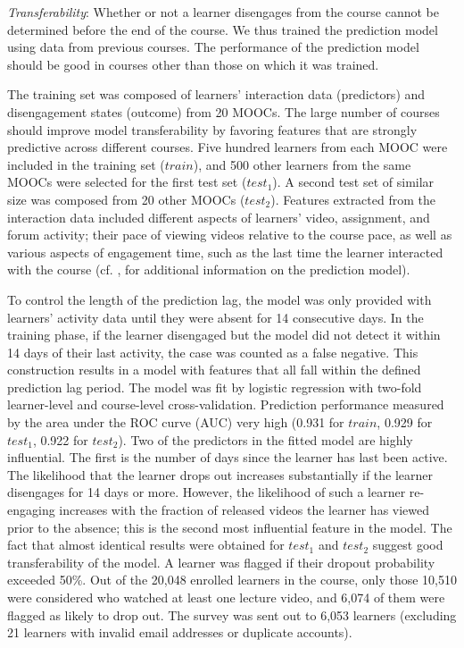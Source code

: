 \documentclass{sigchi}\usepackage[]{graphicx}\usepackage[]{color}
\begin{document}
\textit{Transferability}: Whether or not a learner disengages from the course cannot be determined before the end of the course. We thus trained the prediction model using data from previous courses. The performance of the prediction model should be good in courses other than those on which it was trained.

The training set was composed of learners' interaction data (predictors) and disengagement states (outcome) from 20 MOOCs. The large number of courses should improve model transferability by favoring features that are strongly predictive across different courses. Five hundred learners from each MOOC were included in the training set ($train$), and 500 other learners from the same MOOCs were selected for the first test set ($test_1$). A second test set of similar size was composed from 20 other MOOCs ($test_2$). Features extracted from the interaction data included different aspects of learners' video, assignment, and forum activity; their pace of viewing videos relative to the course pace, as well as various aspects of engagement time, such as the last time the learner interacted with the course (cf. \cite{halawa2014dropout}, for additional information on the prediction model).

To control the length of the prediction lag, the model was only provided with learners' activity data until they were absent for 14 consecutive days. In the training phase, if the learner disengaged but the model did not detect it within 14 days of their last activity, the case was counted as a false negative. This construction results in a model with features that all fall within the defined prediction lag period. The model was fit by logistic regression with two-fold learner-level and course-level cross-validation. Prediction performance measured by the area under the ROC curve (AUC) very high (0.931 for $train$, 0.929 for $test_1$, 0.922 for $test_2$). Two of the predictors in the fitted model are highly influential. The first is the number of days since the learner has last been active. The likelihood that the learner drops out increases substantially if the learner disengages for 14 days or more. However, the likelihood of such a learner re-engaging increases with the fraction of released videos the learner has viewed prior to the absence; this is the second most influential feature in the model. The fact that almost identical results were obtained for $test_1$ and $test_2$ suggest good transferability of the model. A learner was flagged if their dropout probability exceeded 50\%. Out of the 20,048 enrolled learners in the course, only those 10,510 were considered who watched at least one lecture video, and 6,074 of them were flagged as likely to drop out. The survey was sent out to 6,053 learners (excluding 21 learners with invalid email addresses or duplicate accounts).
\end{document}
